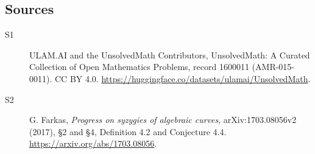 \documentclass[11pt]{article}
\begin{document}
\subsection{Sources}
\begin{description}
\item[\hypertarget{source:1600011:1}{S1}] ULAM.AI and the UnsolvedMath Contributors, UnsolvedMath: A Curated Collection of Open Mathematics Problems, record 1600011 (AMR-015-0011). CC BY 4.0. \url{https://huggingface.co/datasets/ulamai/UnsolvedMath}.
\item[\hypertarget{source:1600011:2}{S2}] G. Farkas, \emph{Progress on syzygies of algebraic curves}, arXiv:1703.08056v2 (2017), §2 and §4, Definition 4.2 and Conjecture 4.4. \url{https://arxiv.org/abs/1703.08056}.
\end{description}
\label{end:1600011}
\end{document}

